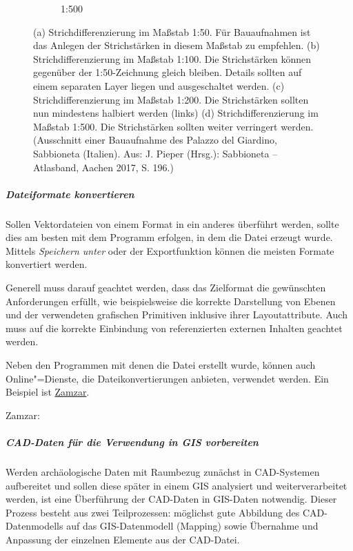 \begin{figure}[h!tbp]
\begin{subfigure}{.5\textwidth}
  \caption{1:500}
\end{subfigure}%
\caption{(a) Strichdifferenzierung im Maßstab 1:50. Für Bauaufnahmen ist das Anlegen der Strichstärken in diesem Maßstab zu empfehlen. (b) Strichdifferenzierung im Maßstab 1:100. Die Strichstärken können gegenüber der 1:50-Zeichnung gleich bleiben. Details sollten auf einem separaten Layer liegen und ausgeschaltet werden. (c) Strichdifferenzierung im Maßstab 1:200. Die Strichstärken sollten nun mindestens halbiert werden (links) (d) Strichdifferenzierung im Maßstab 1:500. Die Strichstärken sollten weiter verringert werden. (Ausschnitt einer Bauaufnahme des Palazzo del Giardino, Sabbioneta (Italien). Aus: J. Pieper (Hrsg.): Sabbioneta -- Atlasband, Aachen 2017, S. 196.)}
\label{abb:massstaeblichkeit_cad}
\end{figure}


\subparagraph{Dateiformate konvertieren}
Sollen Vektordateien von einem Format in ein anderes überführt werden, sollte dies am besten mit dem Programm erfolgen, in dem die Datei erzeugt wurde. Mittels \emph{Speichern unter} oder der Exportfunktion können die meisten Formate konvertiert werden.

Generell muss darauf geachtet werden, dass das Zielformat die gewünschten Anforderungen erfüllt, wie beispielsweise die korrekte Darstellung von Ebenen und der verwendeten grafischen Primitiven inklusive ihrer Layoutattribute. Auch muss auf die korrekte Einbindung von referenzierten externen Inhalten geachtet werden.

Neben den Programmen mit denen die Datei erstellt wurde, können auch Online"=Dienste, die Dateikonvertierungen anbieten, verwendet werden. Ein Beispiel ist \href{http://www.zamzar.com/url/}{Zamzar}.

\begin{flushleft}
    Zamzar: 
\end{flushleft}


\subparagraph{CAD-Daten für die Verwendung in GIS vorbereiten}
Werden archäologische Daten mit Raumbezug zunächst in CAD-Systemen aufbereitet und sollen diese später in einem GIS analysiert und weiterverarbeitet werden, ist eine Überführung der CAD-Daten in GIS-Daten notwendig. Dieser Prozess besteht aus zwei Teilprozessen: möglichst gute Abbildung des CAD-Datenmodells auf das GIS-Datenmodell (Mapping) sowie Übernahme und Anpassung der einzelnen Elemente aus der CAD-Datei.

